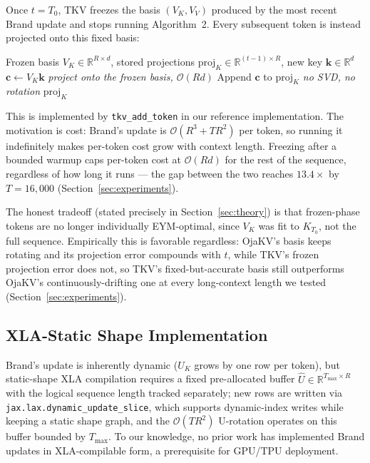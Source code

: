 \documentclass{article}
\newcommand{\R}{\mathbb{R}}
\begin{document}
Once $t = T_0$, TKV freezes the basis $(V_K, V_V)$ produced by the most
recent Brand update and stops running Algorithm~2.  Every subsequent token
is instead projected onto this fixed basis:

\begin{algorithm}[H]
\caption{TKV Frozen-Phase Token Update (per token, $t > T_0$)}
\begin{algorithmic}[1]
\Require Frozen basis $V_K \in \R^{R \times d}$, stored projections
         $\mathrm{proj}_K \in \R^{(t-1) \times R}$, new key $\mathbf{k} \in \R^d$
\State $\mathbf{c} \leftarrow V_K \mathbf{k}$ \hfill \textit{project onto the frozen basis, $\mathcal{O}(Rd)$}
\State Append $\mathbf{c}$ to $\mathrm{proj}_K$ \hfill \textit{no SVD, no rotation}
\State \Return $\mathrm{proj}_K$
\end{algorithmic}
\end{algorithm}

This is implemented by \texttt{tkv\_add\_token} in our reference
implementation.  The motivation is cost: Brand's update is
$\mathcal{O}(R^3 + TR^2)$ per token, so running it indefinitely makes
per-token cost grow with context length.  Freezing after a bounded warmup
caps per-token cost at $\mathcal{O}(Rd)$ for the rest of the sequence,
regardless of how long it runs --- the gap between the two reaches
$13.4\times$ by $T=16{,}000$ (Section~\ref{sec:experiments}).

The honest tradeoff (stated precisely in Section~\ref{sec:theory}) is that
frozen-phase tokens are no longer individually EYM-optimal, since $V_K$
was fit to $K_{T_0}$, not the full sequence.  Empirically this is
favorable regardless: OjaKV's basis keeps rotating and its projection
error compounds with $t$, while TKV's frozen projection error does not, so
TKV's fixed-but-accurate basis still outperforms OjaKV's
continuously-drifting one at every long-context length we tested
(Section~\ref{sec:experiments}).

\subsection{XLA-Static Shape Implementation}
\label{sec:xla}

Brand's update is inherently dynamic ($U_K$ grows by one row per token), but
static-shape XLA compilation requires a fixed pre-allocated buffer
$\hat{U} \in \R^{T_{\max} \times R}$ with the logical sequence length
tracked separately; new rows are written via
\texttt{jax.lax.dynamic\_update\_slice}, which supports dynamic-index
writes while keeping a static shape graph, and the $\mathcal{O}(TR^2)$
U-rotation operates on this buffer bounded by $T_{\max}$.  To our
knowledge, no prior work has implemented Brand updates in XLA-compilable
form, a prerequisite for GPU/TPU deployment.
\end{document}
